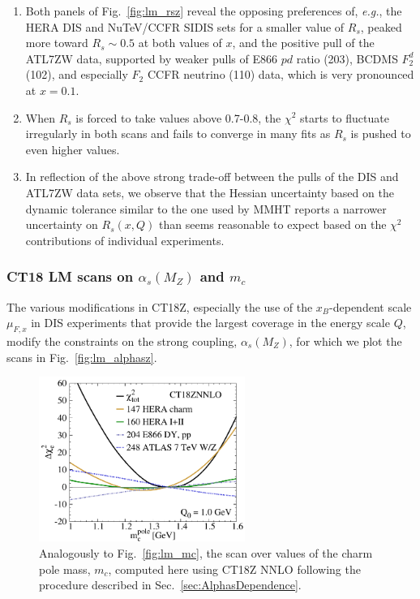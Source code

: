 \begin{enumerate}

\item Both panels of Fig.~\ref{fig:lm_rsz} reveal the opposing preferences
of, {\it e.g.}, the HERA DIS and NuTeV/CCFR SIDIS sets for a smaller value of
$R_s$, peaked more toward $R_s\!\sim\! 0.5$ at both values of $x$,
and the positive pull of the ATL7ZW data, supported by weaker pulls of
E866 $pd$ ratio (203), BCDMS $F_2^d$ (102), and especially
$F_2$ CCFR neutrino (110) data, which is very pronounced at $x=0.1$.

\item When $R_s$ is forced to take values above 0.7-0.8, the $\chi^2$
starts to fluctuate irregularly in both scans and fails to converge in
many fits as $R_s$ is pushed to even higher values.

\item In reflection of the above strong trade-off between the pulls of the
DIS and ATL7ZW data sets, we observe that the Hessian uncertainty
based on the dynamic tolerance similar to the one used by MMHT reports
a narrower uncertainty on $R_s(x,Q)$ than seems reasonable to expect based on the $\chi^2$ contributions of individual experiments.

\end{enumerate}

\subsubsection{CT18 LM scans on $\alpha_s(M_Z)$ and $m_c$}
\label{sec:CT18Zalphas}
%
The various modifications in CT18Z, especially the use of the
$x_B$-dependent scale $\mu_{F,x}$ in DIS experiments that provide the
largest coverage in the energy scale $Q$, modify 
the constraints on the strong coupling, $\alpha_s(M_Z)$,
for which we plot the scans in Fig.~\ref{fig:lm_alphasz}.
%

%
\begin{figure}[htbp]
\centering
\includegraphics[width=0.6\textwidth]{./fig/LM/i2TZn3Q01-00mc1-35_DEchi2_re_ect.pdf}
\caption{
        Analogously to Fig.~\ref{fig:lm_mc}, the scan over values of the charm pole mass, $m_c$, computed here using CT18Z NNLO following the procedure described in Sec.~\ref{sec:AlphasDependence}. 
        }
\label{fig:lm_mcZ}
\end{figure}
%

